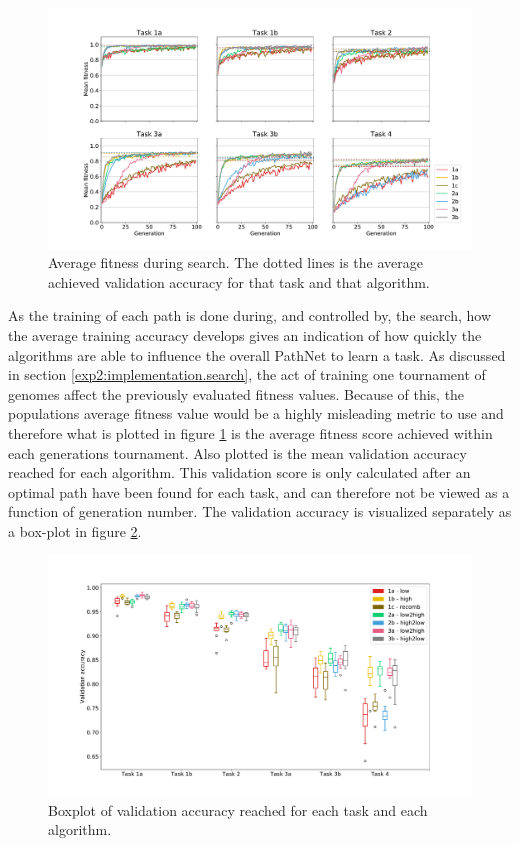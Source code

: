 \begin{figure}
    \includegraphics[width=1.2\textwidth,center]{Chapters/4.Experiments/exp2/figures/inuse/Training_accuracy.pdf}
    \caption[Fitness plot]{Average fitness during search. The dotted lines is the average achieved validation accuracy for that task and that algorithm.}
    \label{fig:search.accuracy}
\end{figure}

As the training of each path is done during, and controlled by, the search, how the average training accuracy develops gives an indication of how quickly the algorithms are able to influence the overall PathNet to learn a task. As discussed in section \ref{exp2:implementation.search}, the act of training one tournament of genomes affect the previously evaluated fitness values. Because of this, the populations average fitness value would be a highly misleading metric to use and therefore what is plotted in figure \ref{fig:search.accuracy} is the average fitness score achieved within each generations tournament. Also plotted is the mean validation accuracy reached for each algorithm. This validation score is only calculated after an optimal path have been found for each task, and can therefore not be viewed as a function of generation number. The validation accuracy is visualized separately as a box-plot in figure \ref{fig:search.validation}.

\begin{figure}
    \includegraphics[width=1.2\textwidth, center]{Chapters/4.Experiments/exp2/figures/inuse/validation_boxplot.pdf}
    \caption[Validation accuracy plot]{Boxplot of validation accuracy reached for each task and each algorithm.}
    \label{fig:search.validation}
\end{figure}


